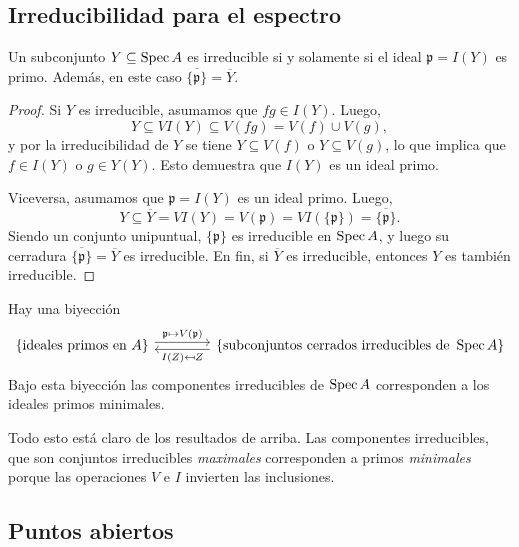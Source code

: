 \documentclass{article}
\numberwithin{equation}{section}
\theoremstyle{definition}
\begin{document}
\subsection{Irreducibilidad para el espectro}

\begin{proposicion}
  Un subconjunto $Y \subseteq \operatorname{Spec} A$ es irreducible si y solamente si el ideal
  $\mathfrak{p} = I (Y)$ es primo. Además, en este caso
  $\overline{\{ \mathfrak{p} \}} = \overline{Y}$.

  \begin{proof}
    Si $Y$ es irreducible, asumamos que $fg \in I (Y)$. Luego,
    $$Y \subseteq VI (Y) \subseteq V (fg) = V (f) \cup V (g),$$
    y por la irreducibilidad de $Y$ se tiene $Y \subseteq V (f)$ o
    $Y \subseteq V (g)$, lo que implica que $f \in I (Y)$ o $g \in Y (Y)$.
    Esto demuestra que $I (Y)$ es un ideal primo.

    Viceversa, asumamos que $\mathfrak{p} = I (Y)$ es un ideal primo. Luego,
    \[ Y \subseteq \overline{Y} = VI (Y) = V (\mathfrak{p}) =
      VI (\{ \mathfrak{p} \}) = \overline{ \{ \mathfrak{p} \} }. \]
    Siendo un conjunto unipuntual, $\{ \mathfrak{p} \}$ es irreducible en
    $\operatorname{Spec} A$, y luego su cerradura
    $\overline{\{ \mathfrak{p} \}} = \overline{Y}$ es irreducible. En fin,
    si $\overline{Y}$ es irreducible, entonces $Y$ es también irreducible.
  \end{proof}
\end{proposicion}

\begin{corolario}
  Hay una biyección
  $$\begin{tikzcd}[column sep=4em]
    \{ \text{ideales primos en }A \} \ar[shift left=0.25em]{r}{\mathfrak{p} \mapsto V (\mathfrak{p})} & \{ \text{subconjuntos cerrados irreducibles de }\Spec A \} \ar[shift left=0.25em]{l}{I (Z) \mapsfrom Z} 
  \end{tikzcd}$$
  Bajo esta biyección las componentes irreducibles de $\operatorname{Spec} A$ corresponden
  a los ideales primos minimales.
\end{corolario}

Todo esto está claro de los resultados de arriba. Las componentes irreducibles,
que son conjuntos irreducibles \emph{maximales} corresponden a primos
\emph{minimales} porque las operaciones $V$ e $I$ invierten las inclusiones.

\subsection{Puntos abiertos}
\end{document}
